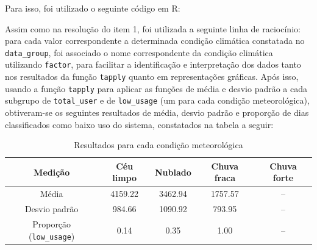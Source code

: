 \documentclass[a4paper, 12pt, titlepage]{article}
\begin{document}
Para isso, foi utilizado o seguinte código em R:


Assim como na resolução do item 1, foi utilizada a seguinte linha de raciocínio: para cada valor correspondente a determinada condição climática constatada no \texttt{data\_group}, foi associado o nome correspondente da condição climática utilizando \texttt{factor}, para facilitar a identificação e interpretação dos dados tanto nos resultados da função \texttt{tapply} quanto em representações gráficas. Após isso, usando a função \texttt{tapply} para aplicar as funções de média e desvio padrão a cada subgrupo de \texttt{total\_user} e de \texttt{low\_usage} (um para cada condição meteorológica), obtiveram-se os seguintes resultados de média, desvio padrão e proporção de dias classificados como baixo uso do sistema, constatados na tabela a seguir:

\begin{table}[h!]
    \centering
    \caption{Resultados para cada condição meteorológica}
    \label{tab:mascara_8u}
    \begin{tabular}{c|c|c|c|c}
        Medição & Céu limpo & Nublado & Chuva fraca & Chuva forte \\\hline
        Média &4159.22 &3462.94 &1757.57 &-- \\ \hline
        Desvio padrão &984.66 &1090.92 &793.95 &-- \\ \hline
        Proporção (\texttt{low\_usage}) &0.14 &0.35 &1.00 &--
    \end{tabular}
\end{table}
\end{document}
